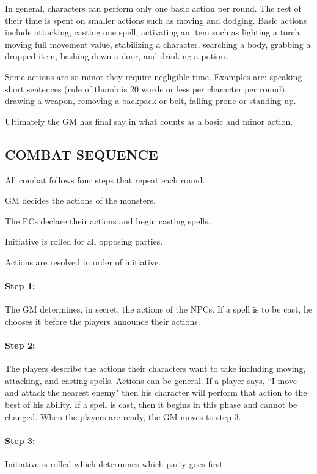 \begin{multicols}{2}
In general, characters can perform only one basic action per round.  The rest of their time is spent on smaller actions such as moving and dodging.  Basic actions include attacking, casting one spell, activating an item such as lighting a torch, moving full movement value, stabilizing a character, searching a body, grabbing a dropped item, bashing down a door, and drinking a potion. 

Some actions are so minor they require negligible time.  Examples are: speaking short sentences (rule of thumb is 20 words or less per character per round), drawing a weapon, removing a backpack or belt, falling prone or standing up.

Ultimately the GM has final say in what counts as a basic and minor action.
 
\subsection{COMBAT SEQUENCE}

All combat follows four steps that repeat each round.

GM decides the actions of the monsters.

The PCs declare their actions and begin casting spells.

Initiative is rolled for all opposing parties.

Actions are resolved in order of initiative.

\paragraph{Step 1:}The GM determines, in secret, the actions of the NPCs.  If a spell is to be cast, he chooses it before the players announce their actions.

\paragraph{Step 2:} The players describe the actions their characters want to take including moving, attacking, and casting spells.  Actions can be general.  If a player says, ``I move and attack the nearest enemy" then his character will perform that action to the best of his ability.  If a spell is cast, then it begins in this phase and cannot be changed.  When the players are ready, the GM moves to step 3.

\paragraph{Step 3:} Initiative is rolled which determines which party goes first.


\end{multicols}

